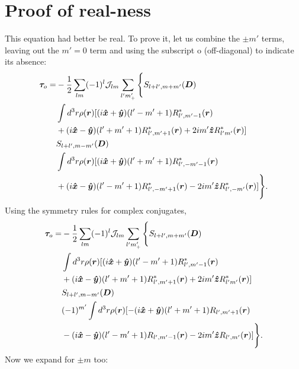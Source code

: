 \documentclass[aps,twocolumn,secnumarabic,balancelastpage,amsmath,amssymb,nofootinbib,floatfix]{revtex4-1}
\begin{document}
\section{Proof of real-ness}
This equation had better be real. To prove it, let us combine the $\pm m'$ terms, leaving out the $m'=0$ term and using the subscript o (off-diagonal) to indicate its absence:
\begin{equation*}
\begin{aligned}
\bm \tau_o = &-\frac{1}{2}\sum_{lm}(-1)^l\mathcal{J}_{lm}\sum_{l'm'_+}\Bigg\{S_{l+l',m+m'}(\bm D) \\
&\int d^3 r \rho(\bm r) [(i\bm{\hat x} + \bm{\hat y})(l'-m'+1)R^*_{l',m'-1}(\bm r)\\
&+(i\bm{\hat x}-\bm{\hat y})(l'+m'+1)R^*_{l',m'+1}(\bm r)+2im'\bm{\hat z} R^*_{l'm'}(\bm r)]\\
&S_{l+l',m-m'}(\bm D) \\
&\int d^3 r \rho(\bm r) [(i\bm{\hat x} + \bm{\hat y})(l'+m'+1)R^*_{l',-m'-1}(\bm r)\\
&+(i\bm{\hat x}-\bm{\hat y})(l'-m'+1)R^*_{l',-m'+1}(\bm r)-2im'\bm{\hat z} R^*_{l',-m'}(\bm r)]\Bigg\}.
\end{aligned}
\end{equation*}
Using the symmetry rules for complex conjugates,
\begin{equation*}
\begin{aligned}
\bm \tau_o = &-\frac{1}{2}\sum_{lm}(-1)^l\mathcal{J}_{lm}\sum_{l'm'_+}\Bigg\{S_{l+l',m+m'}(\bm D) \\
&\int d^3 r \rho(\bm r) [(i\bm{\hat x} + \bm{\hat y})(l'-m'+1)R^*_{l',m'-1}(\bm r)\\
&+(i\bm{\hat x}-\bm{\hat y})(l'+m'+1)R^*_{l',m'+1}(\bm r)+2im'\bm{\hat z} R^*_{l'm'}(\bm r)]\\
&S_{l+l',m-m'}(\bm D) \\
&(-1)^{m'}\int d^3 r \rho(\bm r) [-(i\bm{\hat x} + \bm{\hat y})(l'+m'+1)R_{l',m'+1}(\bm r)\\
&-(i\bm{\hat x}-\bm{\hat y})(l'-m'+1)R_{l',m'-1}(\bm r)-2im'\bm{\hat z} R_{l',m'}(\bm r)]\Bigg\}.
\end{aligned}
\end{equation*}
Now we expand for $\pm m$ too:
\end{document}

